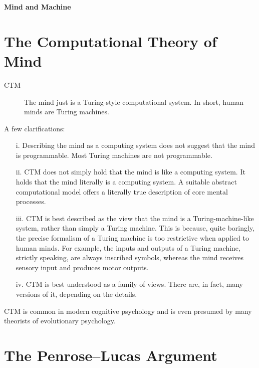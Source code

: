 \documentclass[11pt]{article}
\theoremstyle{definition}
\begin{document}




\begin{center}
{\LARGE \bf Mind and Machine}
\end{center}

\smallskip

\section{The Computational Theory of Mind}

\begin{description}
\item[CTM] The mind just is a Turing-style computational system.  In short, human minds are Turing machines.
\end{description}

A few clarifications:
\begin{enumerate}
\item[i.] Describing the mind as a computing system does not suggest that the mind is programmable. Most Turing machines are not programmable.
\item[ii.] CTM does not simply hold that the mind is like a computing system. It holds that the mind literally is a computing system. A suitable abstract computational model offers a literally true description of core mental processes. 
\item[iii.] CTM is best described as the view that the mind is a Turing-machine-like system, rather than simply a Turing machine. This is because, quite boringly, the precise formalism of a Turing machine is too restrictive when applied to human minds. For example, the inputs and outputs of a Turing machine, strictly speaking, are always inscribed symbols, whereas the mind receives sensory input and produces motor outputs.
\item[iv.] CTM is best understood as a family of views. There are, in fact, many versions of it, depending on the details.
\end{enumerate}

CTM is common in modern cognitive psychology and is even presumed by many theorists of evolutionary psychology.

\section{The Penrose–Lucas Argument}
\end{document}

